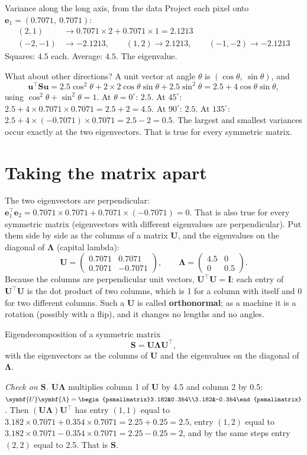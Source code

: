 \documentclass[11pt,a4paper,oneside,openany]{book}
\newcommand{\B}[1]{{\symbf{#1}}}
\newcommand{\B}[1]{{\bm{#1}}}
\newcommand{\T}{^{\top}}
\newcommand{\ve}{\B{e}}
\newcommand{\vu}{\B{u}}
\newcommand{\mS}{\B{S}}
\newcommand{\mU}{\B{U}}
\newcommand{\mI}{\B{I}}
\newcommand{\mLam}{\B{\Lambda}}
\begin{document}
\begin{worked}[label=we:eigvar]{Variance along the long axis, from the data}
Project each pixel onto $\ve_1=(0.7071,\ 0.7071)$:
\begin{align*}
(2,1)&\to 0.7071\times2+0.7071\times1=2.1213\\
(-2,-1)&\to -2.1213,\qquad (1,2)\to 2.1213,\qquad (-1,-2)\to -2.1213
\end{align*}
Squares: $4.5$ each. Average: $4.5$. The eigenvalue.
\end{worked}

What about other directions? A unit vector at angle $\theta$ is $(\cos\theta,\ \sin\theta)$, and
\[
  \vu\T\mS\vu=2.5\cos^2\theta+2\times2\cos\theta\sin\theta+2.5\sin^2\theta=2.5+4\cos\theta\sin\theta,
\]
using $\cos^2\theta+\sin^2\theta=1$. At $\theta=0^\circ$: $2.5$. At $45^\circ$: $2.5+4\times0.7071\times0.7071=2.5+2=4.5$. At
$90^\circ$: $2.5$. At $135^\circ$: $2.5+4\times(-0.7071)\times0.7071=2.5-2=0.5$. The largest and smallest variances occur
exactly at the two eigenvectors. That is true for every symmetric matrix.

\section{Taking the matrix apart}

The two eigenvectors are perpendicular: $\ve_1\T\ve_2=0.7071\times0.7071+0.7071\times(-0.7071)=0$. That is also true for every
symmetric matrix (eigenvectors with different eigenvalues are perpendicular). Put them side by side as the columns of a matrix
$\mU$, and the eigenvalues on the diagonal of $\mLam$ (capital lambda):
\[
  \mU=\begin{pmatrix}0.7071&0.7071\\0.7071&-0.7071\end{pmatrix},\qquad \mLam=\begin{pmatrix}4.5&0\\0&0.5\end{pmatrix}.
\]
Because the columns are perpendicular unit vectors, $\mU\T\mU=\mI$: each entry of $\mU\T\mU$ is the dot product of two columns,
which is 1 for a column with itself and 0 for two different columns. Such a $\mU$ is called \textbf{orthonormal}; as a machine
it is a rotation (possibly with a flip), and it changes no lengths and no angles.

\begin{rulebox}[label=rule:eigdec]{Eigendecomposition of a symmetric matrix}
\[
  \mS=\mU\mLam\mU\T,
\]
with the eigenvectors as the columns of $\mU$ and the eigenvalues on the diagonal of $\mLam$.

\emph{Check on $\mS$.} $\mU\mLam$ multiplies column 1 of $\mU$ by 4.5 and column 2 by 0.5:
$\mU\mLam=\begin{psmallmatrix}3.182&0.354\\3.182&-0.354\end{psmallmatrix}$. Then $(\mU\mLam)\mU\T$ has entry $(1,1)$ equal to
$3.182\times0.7071+0.354\times0.7071=2.25+0.25=2.5$, entry $(1,2)$ equal to $3.182\times0.7071-0.354\times0.7071=2.25-0.25=2$, and
by the same steps entry $(2,2)$ equal to 2.5. That is $\mS$.
\end{rulebox}
\end{document}
